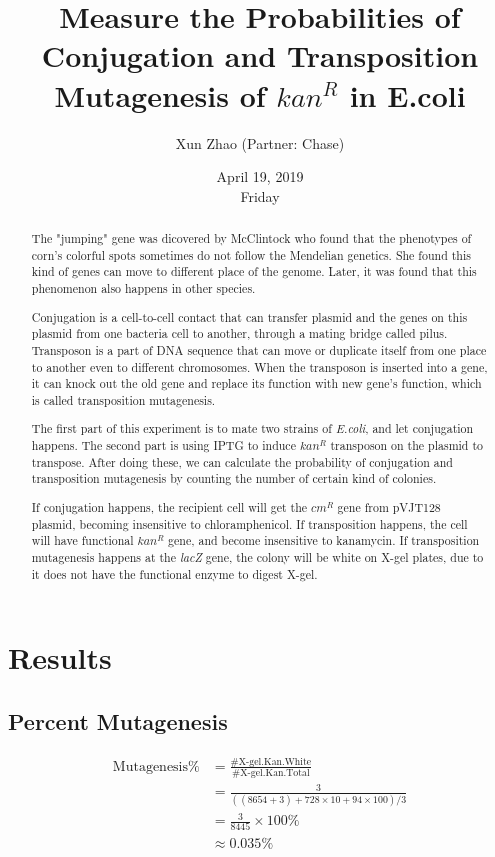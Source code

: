 \documentclass{ctexart}
\title{\bf{Measure the Probabilities of Conjugation and Transposition Mutagenesis of }$kan^R$ \bf{in E.coli}}
\author{Xun Zhao (Partner: Chase)}
\date{April 19, 2019\\Friday}
\begin{document}
    \begin{titlepage}
        \maketitle
        \setcounter{page}{0}
        \thispagestyle{empty}
    \end{titlepage}

    \renewcommand{\abstractname}{Introduction}
    \begin{abstract}
		The "jumping" gene was dicovered by McClintock who found that the phenotypes of corn's colorful spots sometimes do not follow the Mendelian genetics. She found this kind of genes can move to different place of the genome. Later, it was found that this phenomenon also happens in other species. 
		
		Conjugation is a cell-to-cell contact that can transfer plasmid and the genes on this plasmid from one bacteria cell to another, through a mating bridge called pilus. Transposon is a part of DNA sequence that can move or duplicate itself from one place to another even to different chromosomes. When the transposon is inserted into a gene, it can knock out the old gene and replace its function with new gene's function, which is called transposition mutagenesis.

		The first part of this experiment is to mate two strains of \emph{E.coli}, and let conjugation happens. The second part is using IPTG to induce $kan^R$ transposon on the plasmid to transpose. After doing these, we can calculate the probability of conjugation and transposition mutagenesis by counting the number of certain kind of colonies.

		If conjugation happens, the recipient cell will get the $cm^R$ gene from pVJT128 plasmid, becoming insensitive to chloramphenicol. If transposition happens, the cell will have functional $kan^R$ gene, and become insensitive to kanamycin. If transposition mutagenesis happens at the \emph{lacZ} gene, the colony will be white on X-gel plates, due to it does not have the functional enzyme to digest X-gel.
	\end{abstract}

	\section{Results}
		\subsection{Percent Mutagenesis}
			$$
			\begin{aligned}
			\text{Mutagenesis}\% &= \frac{\#\text{X-gel.Kan.White}}{\#\text{X-gel.Kan.Total}}\\
			&= \frac{3}{((8654 + 3) + 728 \times 10 + 94 \times 100) / 3}\\
			&= \frac{3}{8445} \times 100\%\\
			&\approx 0.035\%
			\end{aligned}
			$$
\end{document}

